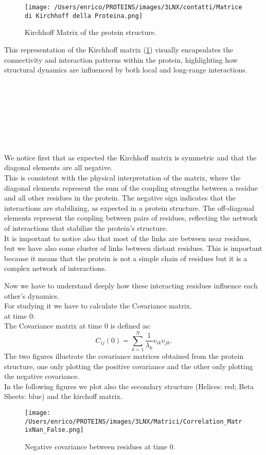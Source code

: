 \documentclass[English, Lau, oneside]{sapthesis}
\begin{document}
\begin{figure}[h!]
    \centering
    \texttt{[image: /Users/enrico/PROTEINS/images/3LNX/contatti/Matrice di Kirchhoff della Proteina.png]} 
    \caption{Kirchhoff Matrix of the protein structure.}
    \label{fig:kirchoff}
\end{figure}

This representation of the Kirchhoff matrix (\ref{fig:kirchoff}) visually encapsulates the connectivity and interaction patterns within the protein, highlighting how structural dynamics are influenced by both local and long-range interactions.

\\\\\\\\\\\\\\
We notice first that as expected the Kirchhoff matrix is symmetric and that the diagonal elements are all negative. \\
This is consistent with the physical interpretation of the matrix, where the diagonal elements represent the sum of the coupling strengths between a residue and all other residues in the protein. The negative sign indicates that the interactions are stabilizing, as expected in a protein structure. The off-diagonal elements represent the coupling between pairs of residues, reflecting the network of interactions that stabilize the protein's structure.\\
It is important to notice also that most of the links are between near residues, but we have also some cluster of links between distant residues. This is important because it means that the protein is not a simple chain of residues but it is a complex network of interactions.


Now we have to understand deeply how these interacting residues influence each other's dynamics.\\
For studying it we have to calculate the Covariance matrix.\\
at time 0:\\
The Covariance matrix at time 0 is defined as:
\[
C_{ij}(0) = \sum_{k=1}^N \frac{1}{\lambda_k} v_{ik} v_{jk}.
\]
The two figures illustrate the covariance matrices obtained from the protein structure, one only plotting the positive covariance and the other only plotting the negative covariance.\\
In the following figures we plot also the secondary structure (Helices: red; Beta Sheets: blue) and the kirchoff matrix.\\
\begin{figure}[h!]
    \centering
    \texttt{[image: /Users/enrico/PROTEINS/images/3LNX/Matrici/Correlation\_MatrixNan\_False.png]}
    \caption{Negative covariance between residues at time 0.}
    \label{fig:Covariance_negative_figo}
\end{figure}
\end{document}
